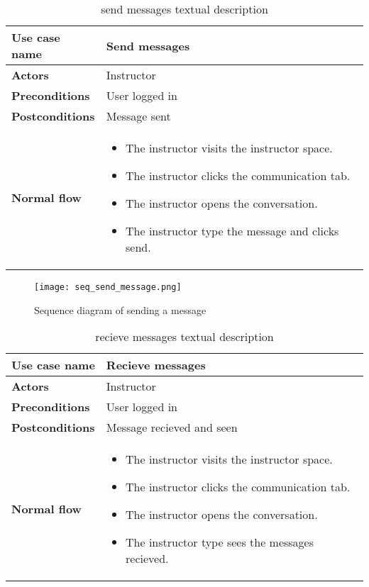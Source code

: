 \begin{table}[H]
\centering
\caption{send messages textual description}
\begin{tabular}{|p{4cm}|p{10cm}|}
\hline
\textbf{\large{Use case name}} & Send messages \\\hline
\textbf{\large{Actors}} & Instructor \\\hline
\textbf{\large{Preconditions}} & User logged in \\\hline
\textbf{\large{Postconditions}} & Message sent  \\\hline
\textbf{\large{Normal flow}} & 
\begin{itemize}
  \item The instructor visits the instructor space.
  \item The instructor clicks the communication tab.
  \item The instructor opens the conversation.
  \item The instructor type the message and clicks send.
\end{itemize}
\\\hline

\end{tabular}
\end{table}

\begin{figure}[!ht]
    \centering
    \texttt{[image: seq\_send\_message.png]}
    \caption{Sequence diagram of sending a message}
    \label{fig:seq_send_message}
\end{figure}

\begin{table}[H]
\centering
\caption{recieve messages textual description}
\begin{tabular}{|p{4cm}|p{10cm}|}
\hline
\textbf{\large{Use case name}} & Recieve messages \\\hline
\textbf{\large{Actors}} & Instructor \\\hline
\textbf{\large{Preconditions}} & User logged in \\\hline
\textbf{\large{Postconditions}} & Message recieved and seen \\\hline
\textbf{\large{Normal flow}} & 
\begin{itemize}
  \item The instructor visits the instructor space.
  \item The instructor clicks the communication tab.
  \item The instructor opens the conversation.
  \item The instructor type sees the messages recieved.
\end{itemize}
\\\hline

\end{tabular}
\end{table}

